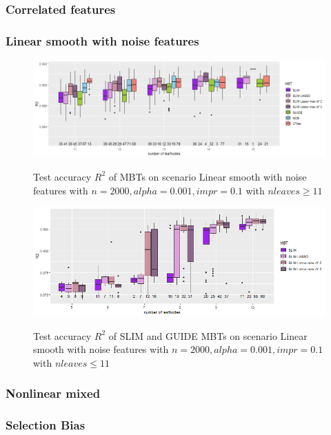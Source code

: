 \begin{table}
\begin{tabular}[t]{l|l|r|r|r|r|r|r|r|r|r}
\end{tabular}
\label{tab:app_linear_mixed_5000}

\end{table}



\subsubsection{Correlated features}

\subsubsection{Linear smooth with noise features}

\begin{figure} 
\caption{Test accuracy $R^2$ of MBTs on scenario Linear smooth with noise features with $n=2000, alpha = 0.001, impr = 0.1$ with $n leaves \geq 11$}
    \includegraphics[width=16cm]{Figures/simulations/batchtools/lasso/lasso_standalone_r2_test.png}
    \label{fig:lasso_standalone_r2_test}
\end{figure} 

\begin{figure} 
\caption{Test accuracy $R^2$ of SLIM and GUIDE MBTs on scenario Linear smooth with noise features with $n=2000, alpha = 0.001, impr = 0.1$ with $n leaves \leq 11$}
    \includegraphics[width=16cm]{Figures/simulations/batchtools/lasso/lasso_standalone_r2_test_slim.png}
    \label{fig:lasso_standalone_r2_test_slim}
\end{figure} 

\subsubsection{Nonlinear mixed}


\subsubsection{Selection Bias}